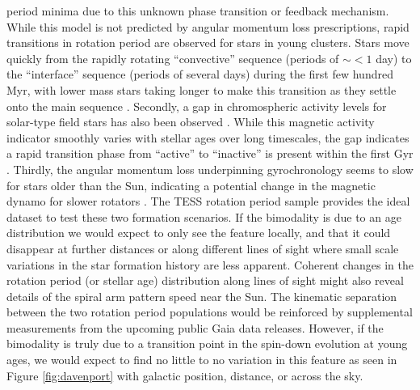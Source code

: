\documentclass[useAMS, usenatbib, preprint, 12pt]{aastex}
\begin{document}
period minima due to this unknown phase transition or feedback mechanism.
While this model is not predicted by angular momentum loss prescriptions,
rapid transitions in rotation period are observed for stars in young clusters.
Stars move quickly from the rapidly rotating “convective” sequence (periods of
$\sim<1$ day) to the “interface” sequence (periods of several days) during the
first few hundred Myr, with lower mass stars taking longer to make this
transition as they settle onto the main sequence \citep{barnes2003}.
Secondly, a gap in chromospheric activity levels for solar-type field stars
has also been observed \citep{vaughan1980}.
While this magnetic activity indicator smoothly varies with stellar ages over
long timescales, the gap indicates a rapid transition phase from “active” to
“inactive” is present within the first Gyr \citep{pace2009}.
Thirdly, the angular momentum loss underpinning gyrochronology seems to slow
for stars older than the Sun, indicating a potential change in the magnetic
dynamo for slower rotators \citep{angus2015, vansaders2016}.
The TESS rotation period sample provides the ideal dataset to test these two
formation scenarios.
If the bimodality is due to an age distribution we would expect to only see
the feature locally, and that it could disappear at further distances or along
different lines of sight where small scale variations in the star formation
history are less apparent.
Coherent changes in the rotation period (or stellar age) distribution along
lines of sight might also reveal details of the spiral arm pattern speed near
the Sun.
The kinematic separation between the two rotation period populations would be
reinforced by supplemental measurements from the upcoming public Gaia data
releases.
However, if the bimodality is truly due to a transition point in the spin-down
evolution at young ages, we would expect to find no little to no variation in
this feature as seen in Figure \ref{fig:davenport} with galactic position,
distance, or across the sky.

\end{document}
